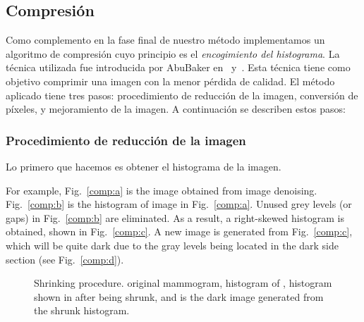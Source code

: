\subsection{Compresión}
\label{compression}

Como complemento en la fase final de nuestro método implementamos un algoritmo
de compresión cuyo principio es el \textit{encogimiento del histograma}. La
técnica utilizada fue introducida por AbuBaker en~\cite{abubaker2006mammogram}
y~\cite{abubaker2007efficient}. Esta técnica tiene como objetivo comprimir una
imagen con la menor pérdida de calidad. El método aplicado tiene tres pasos:
procedimiento de reducción de la imagen, conversión de píxeles, y mejoramiento
de la imagen. A continuación se describen estos pasos:

\subsubsection{Procedimiento de reducción de la imagen} 

Lo primero que hacemos es obtener el histograma de la imagen.

For example, Fig.~\ref{comp:a} is the image obtained
from image denoising. Fig.~\ref{comp:b} is the histogram of image in
Fig.~\ref{comp:a}. Unused grey levels (or gaps) in Fig.~\ref{comp:b} are
eliminated. As a result, a right-skewed histogram is obtained, shown in
Fig.~\ref{comp:c}. A new image is generated from Fig.~\ref{comp:c}, which will
be quite dark due to the gray levels being located in the dark side section
(see Fig.~\ref{comp:d}).

\begin{figure}[h]
  \begin{center}
    \hspace{12pt}
    \hspace{12pt}
    \hspace{12pt}
  \end{center}

  \caption{Shrinking procedure. \protect{} original mammogram,
  \protect{} histogram of \protect{},
  \protect{} histogram shown in \protect{} after
  being shrunk, and \protect{} is the dark image generated from
  the shrunk histogram.} 
  
  \label{img:shrinking-one} 
\end{figure}

